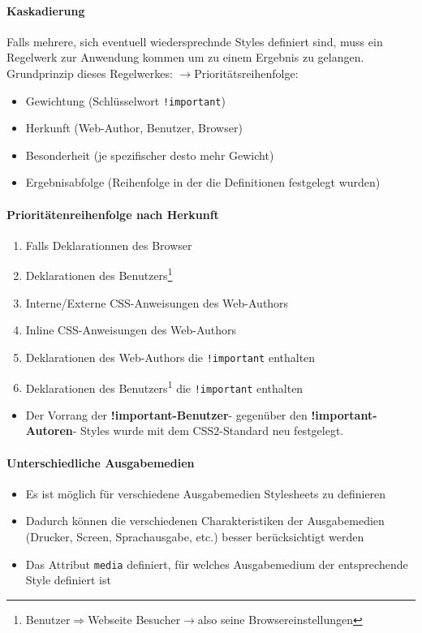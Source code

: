 \documentclass[10pt,a4paper]{article}
\begin{document}
\paragraph{Kaskadierung}Falls mehrere, sich eventuell wiedersprechnde Styles definiert sind, muss ein Regelwerk zur Anwendung kommen um zu einem Ergebnis zu gelangen.
\noindent
Grundprinzip dieses Regelwerkes: $\rightarrow$Prioritätsreihenfolge:
\begin{itemize}[noitemsep,topsep=0pt,leftmargin=*]
    \item Gewichtung (Schlüsselwort \texttt{!important})
    \item Herkunft (Web-Author, Benutzer, Browser)
    \item Besonderheit (je spezifischer desto mehr Gewicht)
    \item Ergebnisabfolge (Reihenfolge in der die Definitionen festgelegt wurden)
\end{itemize}

\paragraph{Prioritätenreihenfolge nach Herkunft}
\begin{enumerate}[noitemsep,topsep=0pt,leftmargin=*]
    \item Falls Deklarationnen des Browser
    \item Deklarationen des Benutzers\footnote{Benutzer$\Rightarrow$Webseite Besucher$\rightarrow$also seine Browsereinstellungen}
    \item Interne/Externe CSS-Anweisungen des Web-Authors
    \item Inline CSS-Anweisungen des Web-Authors
    \item Deklarationen des Web-Authors die \texttt{!important} enthalten
    \item Deklarationen des Benutzers\textsuperscript{1} die \texttt{!important} enthalten
\end{enumerate}
\begin{itemize}[noitemsep,topsep=0pt,leftmargin=*]
    \item Der Vorrang der \textbf{!important-Benutzer}- gegenüber den \textbf{!important-Autoren}- Styles wurde mit dem CSS2-Standard neu festgelegt.
\end{itemize}

\paragraph{Unterschiedliche Ausgabemedien}
\begin{itemize}[noitemsep,topsep=0pt,leftmargin=*]
    \item Es ist möglich für verschiedene Ausgabemedien Stylesheets zu definieren
    \item Dadurch können die verschiedenen Charakteristiken der Ausgabemedien (Drucker, Screen, Sprachausgabe, etc.) besser berücksichtigt werden
    \item Das Attribut \texttt{media} definiert, für welches Ausgabemedium der entsprechende Style definiert ist
\end{itemize}
\end{document}
